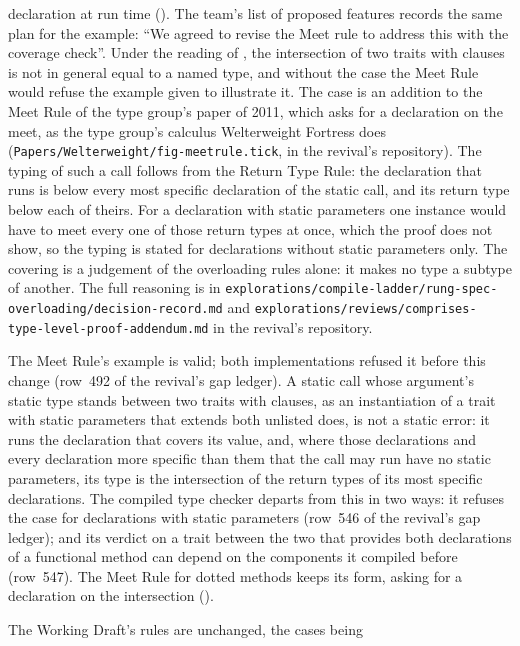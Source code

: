 \begin{description}
declaration at run time ().
The team's list of proposed features records the same plan for the example:
``We agreed to revise the Meet rule to address this with the coverage check''.
Under the reading of , the intersection of two traits with
 clauses is not in general equal to a named type, and without the
case the Meet Rule would refuse the example given to illustrate it.
The case is an addition to the Meet Rule of the type group's paper of 2011,
which asks for a declaration on the meet, as the type group's calculus
Welterweight Fortress does (\nolinkurl{Papers/Welterweight/fig-meetrule.tick},
in the revival's repository).
The typing of such a call follows from the Return Type Rule: the declaration
that runs is below every most specific declaration of the static call, and its
return type below each of theirs.
For a declaration with static parameters one instance would have to meet every
one of those return types at once, which the proof does not show, so the typing
is stated for declarations without static parameters only.
The covering is a judgement of the overloading rules alone: it makes no type a
subtype of another.
The full reasoning is in
\nolinkurl{explorations/compile-ladder/rung-spec-overloading/decision-record.md}
and \nolinkurl{explorations/reviews/comprises-type-level-proof-addendum.md} in
the revival's repository.
\item[Effect] The Meet Rule's example is valid; both implementations refused it
before this change (row~492 of the revival's gap ledger).
A static call whose argument's static type stands between two traits with
 clauses, as an instantiation of a trait with static parameters
that extends both unlisted does, is not a static error: it runs the declaration
that covers its value, and, where those declarations and every declaration more
specific than them that the call may run have no static parameters, its type is
the intersection of the return types of its most specific declarations.
The compiled type checker departs from this in two ways: it refuses the case
for declarations with static parameters (row~546 of the revival's gap ledger);
and its verdict on a trait between the two that provides both declarations of a
functional method can depend on the components it compiled before (row~547).
The Meet Rule for dotted methods keeps its form, asking for a declaration on the
intersection ().
\item[Original text] The Working Draft's rules are unchanged, the cases being

\end{description}

